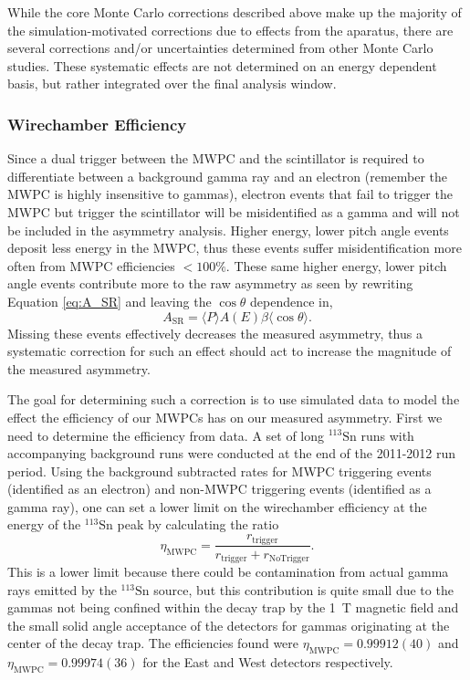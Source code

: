 While the core Monte Carlo corrections described above make up the majority of the
simulation-motivated corrections due to effects from the aparatus, there are several
corrections and/or uncertainties determined from other Monte Carlo studies. These
systematic effects are not determined on an energy dependent basis, but rather integrated
over the final analysis window.

\subsubsection{Wirechamber Efficiency} \label{sssec:mwpcEff}

Since a dual trigger between the MWPC and the scintillator is required to differentiate between
a background gamma ray and an electron (remember the MWPC is highly insensitive to gammas),
electron events that fail to
trigger the MWPC but trigger the scintillator will be misidentified as a gamma and will not
be included in the asymmetry analysis. Higher energy, lower pitch angle events deposit less
energy in the MWPC, thus these events suffer misidentification more often
from MWPC efficiencies $<100\%$. These same
higher energy, lower pitch angle events contribute more to the
raw asymmetry as seen by rewriting Equation \ref{eq:A_SR}
and leaving the $\cos\theta$ dependence in,
%
\begin{equation}
  A_{\mathrm{SR}}=\langle P \rangle A(E) \beta \langle \cos\theta \rangle.
\end{equation}
%
\noindent Missing these events effectively decreases the measured asymmetry, thus a systematic
correction for such an effect
should act to increase the magnitude of the measured asymmetry.

The goal for determining such a correction is to use simulated data to model the effect
the efficiency of our MWPCs has on our measured asymmetry. First we need to determine
the efficiency from data. A set of long $^{113}\mathrm{Sn}$ runs with accompanying background runs
were conducted at the end of the 2011-2012 run period.
Using the background subtracted rates for MWPC triggering events (identified as an electron)
and non-MWPC triggering events (identified as a gamma ray), one can set
a lower limit on the wirechamber efficiency at the energy of the $^{113}\mathrm{Sn}$ peak
by calculating the ratio
%
\begin{equation}
  \eta_{\mathrm{MWPC}} = \frac{r_{\mathrm{trigger}}}{r_{\mathrm{trigger}}+r_{\mathrm{NoTrigger}}}.
\end{equation}
%
\noindent This is a lower limit because there could be contamination from actual gamma
rays emitted by the $^{113}\mathrm{Sn}$ source, but this contribution is quite small due
to the gammas not being confined within
the decay trap by the 1~T magnetic field and the small solid angle acceptance of the detectors
for gammas originating at the center of the decay trap. The efficiencies found were
$\eta_{\mathrm{MWPC}}=0.99912(40)$ and $\eta_{\mathrm{MWPC}}=0.99974(36)$ for the East and West
detectors respectively. 


